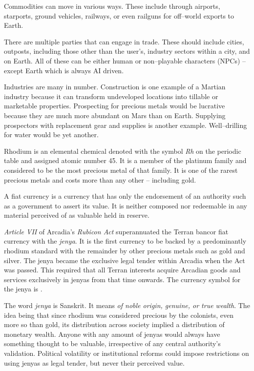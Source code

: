 Commodities can move in various ways. These include through airports, starports, ground vehicles, railways, or even railguns for off--world exports to Earth.

There are multiple parties that can engage in trade. These should include cities, outposts, including those other than the user's, industry sectors within a city, and on Earth. All of these can be either human or non--playable characters (NPCs) -- except Earth which is always AI driven.

Industries are many in number. Construction is one example of a Martian industry because it can transform undeveloped locations into tillable or marketable properties. Prospecting for precious metals would be lucrative because they are much more abundant on Mars than on Earth. Supplying prospectors with replacement gear and supplies is another example. Well--drilling for water would be yet another.

Rhodium is an elemental chemical denoted with the symbol {\it Rh} on the periodic table and assigned atomic number 45. It is a member of the platinum family and considered to be the most precious metal of that family. It is one of the rarest precious metals and costs more than any other -- including gold.

A fiat currency is a currency that has only the endorsement of an authority such as a government to assert its value. It is neither composed nor redeemable in any material perceived of as valuable held in reserve.

{\it Article VII} of Arcadia's {\it Rubicon Act} superannuated the Terran bancor fiat currency with the {\it jenya}. It is the first currency to be backed by a predominantly rhodium standard with the remainder by other precious metals such as gold and silver. The jenya became the exclusive legal tender within Arcadia when the Act was passed. This required that all Terran interests acquire Arcadian goods and services exclusively in jenyas from that time onwards. The currency symbol for the jenya is .

    {}

The word {\it jenya} is Sanskrit. It means {\it of noble origin, genuine, or true wealth}. The idea being that since rhodium was considered precious by the colonists, even more so than gold, its distribution across society implied a distribution of monetary wealth. Anyone with any amount of jenyas would always have something thought to be valuable, irrespective of any central authority's validation. Political volatility or institutional reforms could impose restrictions on using jenyas as legal tender, but never their perceived  value.

